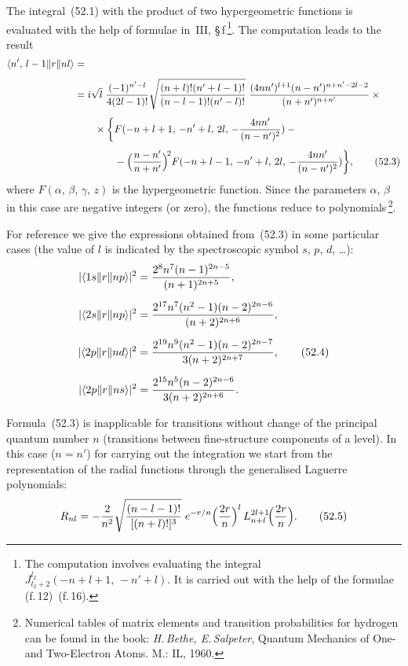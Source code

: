 The integral~(52.1) with the product of two hypergeometric functions is evaluated with the help of formulae in~III, \S\,f\,\footnote{The computation involves evaluating the integral $J^{l_2}_{l_2+2}(-n+l+1,\,-n'+l)$. It is carried out with the help of the formulae (f.\,12)~(f.\,16).}. The computation leads to the result
\begin{align}
\langle n',\,l-1\|r\|nl\rangle &={}\notag\\[4pt]
&= i\sqrt{l}\;\frac{(-1)^{n'-l}}{4(2l-1)!}\sqrt{\frac{(n+l)!(n'+l-1)!}{(n-l-1)!(n'-l)!}}\;\frac{(4nn')^{l+1}(n-n')^{n+n'-2l-2}}{(n+n')^{n+n'}}\times{}\notag\\[4pt]
&\qquad{}\times\biggl\{F(-n+l+1,\,-n'+l,\,2l,\,-\frac{4nn'}{(n-n')^2}) -{}\notag\\[4pt]
&\qquad\qquad -\Bigl(\frac{n-n'}{n+n'}\Bigr)^{\!2}F(-n+l-1,\,-n'+l,\,2l,\,-\frac{4nn'}{(n-n')^2})\biggr\},
\tag{52.3}
\end{align}
where $F(\alpha,\,\beta,\,\gamma,\,z)$ is the hypergeometric function. Since the parameters $\alpha$, $\beta$ in this case are negative integers (or zero), the functions reduce to polynomials\,\footnote{Numerical tables of matrix elements and transition probabilities for hydrogen can be found in the book: \textit{H.\,Bethe, E.\,Salpeter}, Quantum Mechanics of One- and Two-Electron Atoms. M.: IL, 1960.}.

For reference we give the expressions obtained from~(52.3) in some particular cases (the value of $l$ is indicated by the spectroscopic symbol $s$, $p$, $d$, \ldots):
\begin{align}
|\langle 1s\|r\|np\rangle|^2 &= \frac{2^8n^7(n-1)^{2n-5}}{(n+1)^{2n+5}},\notag\\[6pt]
|\langle 2s\|r\|np\rangle|^2 &= \frac{2^{17}n^7(n^2-1)(n-2)^{2n-6}}{(n+2)^{2n+6}},\notag\\[6pt]
|\langle 2p\|r\|nd\rangle|^2 &= \frac{2^{19}n^9(n^2-1)(n-2)^{2n-7}}{3(n+2)^{2n+7}},
\tag{52.4}\\[6pt]
|\langle 2p\|r\|ns\rangle|^2 &= \frac{2^{15}n^5(n-2)^{2n-6}}{3(n+2)^{2n+6}}.\notag
\end{align}

Formula~(52.3) is inapplicable for transitions without change of the principal quantum number $n$ (transitions between fine-structure components of a level). In this case ($n = n'$) for carrying out the integration we start from the representation of the radial functions through the generalised Laguerre polynomials:
\begin{equation}
R_{nl} = -\frac{2}{n^2}\sqrt{\frac{(n-l-1)!}{[(n+l)!]^3}}\;e^{-r/n}\Bigl(\frac{2r}{n}\Bigr)^l\,L^{2l+1}_{n+l}\!\Bigl(\frac{2r}{n}\Bigr).
\tag{52.5}
\end{equation}

